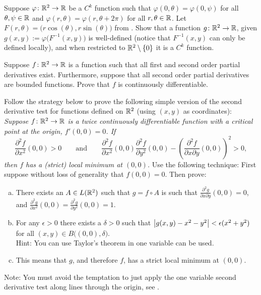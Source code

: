 \begin{exercise}
Suppose $\varphi \colon {\mathbb{R}}^2 \to {\mathbb{R}}$ be a $C^k$ function
such that
$\varphi(0,\theta) = \varphi(0,\psi)$ for all $\theta,\psi \in {\mathbb{R}}$
and
$\varphi(r,\theta) = \varphi(r,\theta+2\pi)$ for all $r,\theta \in {\mathbb{R}}$.
Let $F(r,\theta) = \bigl(r \cos(\theta), r \sin(\theta) \bigr)$ from 
.  Show that a function
$g \colon {\mathbb{R}}^2 \to {\mathbb{R}}$, given
$g(x,y) := \varphi \bigl(F^{-1}(x,y)\bigr)$ is well-defined (notice that
$F^{-1}(x,y)$ can only be defined locally), and
when restricted to ${\mathbb{R}}^2 \setminus \{ 0 \}$ it is a $C^k$ function.
\end{exercise}

\begin{exercise}
Suppose $f \colon {\mathbb{R}}^2 \to {\mathbb{R}}$ is a function such that
all first and second order partial derivatives exist.  Furthermore,
suppose that all second order partial derivatives are bounded functions.
Prove that $f$ is continuously differentiable.
\end{exercise}

\begin{exercise}
Follow the strategy below to
prove the following simple version of the second derivative test for
functions defined on ${\mathbb{R}}^2$ (using $(x,y)$ as coordinates):  \emph{Suppose $f \colon {\mathbb{R}}^2
\to {\mathbb{R}}$ is a twice continuously differentiable function with a
critical point at the origin, $f'(0,0) = 0$.  If
\begin{equation*}
\frac{\partial^2 f}{\partial x^2} (0,0) > 0 \qquad \text{and} \qquad
\frac{\partial^2 f}{\partial x^2} (0,0) \frac{\partial^2 f}{\partial y^2}
(0,0) -
{\left(\frac{\partial^2 f}{\partial x \partial y} (0,0) \right)}^2 > 0 ,
\end{equation*}
then $f$ has a (strict) local minimum at $(0,0)$.}
Use the following technique:  First suppose without loss of generality
that $f(0,0) = 0$.  Then prove:
\begin{enumerate}[a)]
\item
There exists an $A \in L({\mathbb{R}}^2)$ such that $g = f \circ A$ is
such that $\frac{\partial^2 g}{\partial x \partial y} (0,0) = 0$, and
$\frac{\partial^2 g}{\partial x^2} (0,0) =
\frac{\partial^2 g}{\partial y^2} (0,0) = 1$.
\item
For any $\epsilon > 0$ there exists a $\delta > 0$
such that 
$\left\lvert {g(x,y) - x^2 - y^2} \right\rvert < \epsilon (x^2+y^2)$ for all
$(x,y) \in B\bigl((0,0),\delta\bigr)$.\\
Hint: You can use Taylor's theorem in one variable can be used.
\item
This means that $g$, and therefore $f$, has a strict local
minimum at $(0,0)$.
\end{enumerate}
Note: You must avoid the temptation to just
apply the one variable second derivative test along lines through the
origin, see .
\end{exercise}

